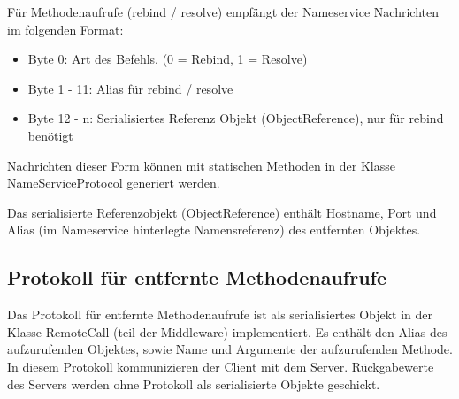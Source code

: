 \documentclass{article}
\begin{document}
Für Methodenaufrufe (rebind / resolve) empfängt der Nameservice Nachrichten im folgenden Format:
\begin{itemize}
\item Byte 0: Art des Befehls. (0 = Rebind, 1 = Resolve)
\item Byte 1 - 11: Alias für rebind / resolve
\item Byte 12 - n: Serialisiertes Referenz Objekt (ObjectReference), nur für rebind benötigt
\end{itemize}

Nachrichten dieser Form können mit statischen Methoden in der Klasse NameServiceProtocol generiert werden.

Das serialisierte Referenzobjekt (ObjectReference) enthält Hostname, Port und Alias (im Nameservice hinterlegte Namensreferenz) des 
entfernten Objektes.

\subsection{Protokoll für entfernte Methodenaufrufe}

Das Protokoll für entfernte Methodenaufrufe ist als serialisiertes Objekt in der Klasse 
RemoteCall (teil der Middleware) implementiert. Es enthält den Alias des aufzurufenden Objektes,
sowie Name und Argumente der aufzurufenden Methode.
In diesem Protokoll kommunizieren der Client mit dem Server.
Rückgabewerte des Servers werden ohne Protokoll als serialisierte Objekte geschickt.
\end{document}
